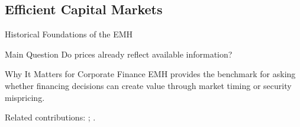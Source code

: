 \subsection{Efficient Capital Markets}

\begin{frame}{Historical Foundations of the EMH}

\begin{block}{Main Question}
Do prices already reflect available information?
\end{block}

\begin{center}
\end{center}

\begin{alertblock}{Why It Matters for Corporate Finance}
EMH provides the benchmark for asking whether financing decisions can
create value through market timing or security mispricing.
\end{alertblock}
{\scriptsize Related contributions: \textcite{malkiel1973random}; \textcite{jensen1978anomalous}.}
\end{frame}

